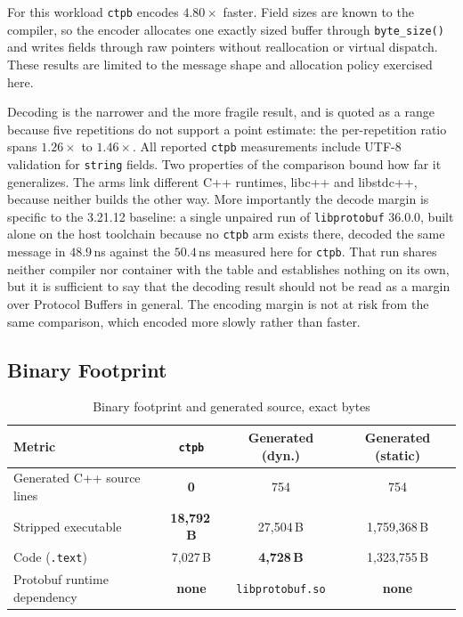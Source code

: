 For this workload \texttt{ctpb} encodes $4.80\times$ faster. Field sizes are known to the compiler, so the encoder allocates one exactly sized buffer through \texttt{byte\_size()} and writes fields through raw pointers without reallocation or virtual dispatch. These results are limited to the message shape and allocation policy exercised here.

Decoding is the narrower and the more fragile result, and is quoted as a range because five repetitions do not support a point estimate: the per-repetition ratio spans $1.26\times$ to $1.46\times$. All reported \texttt{ctpb} measurements include UTF-8 validation for \texttt{string} fields. Two properties of the comparison bound how far it generalizes. The arms link different C++ runtimes, libc++ and libstdc++, because neither builds the other way. More importantly the decode margin is specific to the 3.21.12 baseline: a single unpaired run of \texttt{libprotobuf} 36.0.0, built alone on the host toolchain because no \texttt{ctpb} arm exists there, decoded the same message in $48.9$\,ns against the $50.4$\,ns measured here for \texttt{ctpb}. That run shares neither compiler nor container with the table and establishes nothing on its own, but it is sufficient to say that the decoding result should not be read as a margin over Protocol Buffers in general. The encoding margin is not at risk from the same comparison, which encoded more slowly rather than faster.

\subsection{Binary Footprint}
\begin{table}[ht]
\centering
\caption{Binary footprint and generated source, exact bytes}
\label{tab:binary_footprint}
\renewcommand{\arraystretch}{1.1}
\setlength{\tabcolsep}{3pt}
\scriptsize
\begin{tabular}{lccc}
\hline
\textbf{Metric} & \textbf{\texttt{ctpb}} & \textbf{Generated (dyn.)} & \textbf{Generated (static)} \\
\hline
Generated C++ source lines & \textbf{0} & 754 & 754 \\
Stripped executable & \textbf{18{,}792\,B} & 27{,}504\,B & 1{,}759{,}368\,B \\
Code (\texttt{.text}) & 7{,}027\,B & \textbf{4{,}728\,B} & 1{,}323{,}755\,B \\
Protobuf runtime dependency & \textbf{none} & \texttt{libprotobuf.so} & \textbf{none} \\
\hline
\end{tabular}
\end{table}


